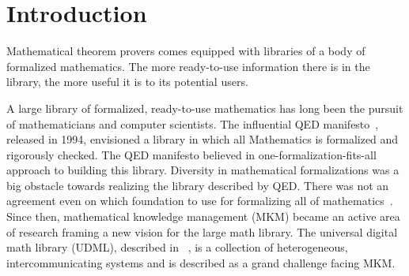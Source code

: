 \chapter{Introduction}



Mathematical theorem provers comes equipped with libraries of a body of formalized mathematics. The more ready-to-use information there is in the library, the more useful it is to its potential users. %
  
A large library of formalized, ready-to-use mathematics has long been the pursuit of mathematicians and computer scientists.  
The influential QED manifesto~\cite{boyer1994qed}, released in 1994, envisioned a library in which all Mathematics is formalized and rigorously checked. The QED manifesto believed in one-formalization-fits-all approach to building this library.
Diversity in mathematical formalizations was a big obstacle towards realizing the library described by QED. There was not an agreement even on which foundation to use for formalizing all of mathematics~\cite{qedrealoaded2016}.  Since then, mathematical knowledge management (MKM) became an active area of research framing a new vision for the large math library. The universal digital math library (UDML), described in ~\cite{farmer2004mkm}, is a collection of heterogeneous, intercommunicating systems and is described as a grand challenge facing MKM. 

